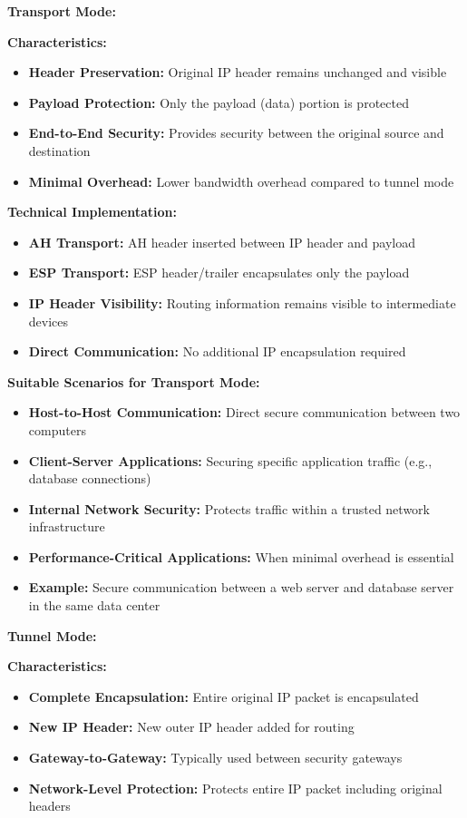\documentclass[12pt,a4paper]{article}
\begin{document}
\textbf{Transport Mode:}

\textbf{Characteristics:}
\begin{itemize}
    \item \textbf{Header Preservation:} Original IP header remains unchanged and visible
    \item \textbf{Payload Protection:} Only the payload (data) portion is protected
    \item \textbf{End-to-End Security:} Provides security between the original source and destination
    \item \textbf{Minimal Overhead:} Lower bandwidth overhead compared to tunnel mode
\end{itemize}

\textbf{Technical Implementation:}
\begin{itemize}
    \item \textbf{AH Transport:} AH header inserted between IP header and payload
    \item \textbf{ESP Transport:} ESP header/trailer encapsulates only the payload
    \item \textbf{IP Header Visibility:} Routing information remains visible to intermediate devices
    \item \textbf{Direct Communication:} No additional IP encapsulation required
\end{itemize}

\textbf{Suitable Scenarios for Transport Mode:}
\begin{itemize}
    \item \textbf{Host-to-Host Communication:} Direct secure communication between two computers
    \item \textbf{Client-Server Applications:} Securing specific application traffic (e.g., database connections)
    \item \textbf{Internal Network Security:} Protects traffic within a trusted network infrastructure
    \item \textbf{Performance-Critical Applications:} When minimal overhead is essential
    \item \textbf{Example:} Secure communication between a web server and database server in the same data center
\end{itemize}

\textbf{Tunnel Mode:}

\textbf{Characteristics:}
\begin{itemize}
    \item \textbf{Complete Encapsulation:} Entire original IP packet is encapsulated
    \item \textbf{New IP Header:} New outer IP header added for routing
    \item \textbf{Gateway-to-Gateway:} Typically used between security gateways
    \item \textbf{Network-Level Protection:} Protects entire IP packet including original headers
\end{itemize}
\end{document}
